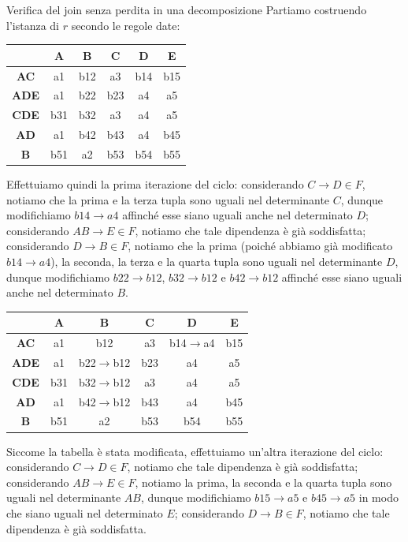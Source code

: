 \begin{Example}{Verifica del join senza perdita in una decomposizione}{}
    Partiamo costruendo l'istanza di $r$ secondo le regole date:
    \begin{center}
        \begin{tabular}{|c|c|c|c|c|c|}
            \hline &\textbf{A} & \textbf{B} & \textbf{C} & \textbf{D} & \textbf{E}\\\hline
            \textbf{AC} & a1 & b12 & a3 & b14 & b15\\
            \textbf{ADE} & a1 & b22 & b23 & a4 & a5\\
            \textbf{CDE} & b31 & b32 & a3 & a4 & a5\\
            \textbf{AD} & a1 & b42 & b43 & a4 & b45\\
            \textbf{B} & b51 & a2 & b53 & b54 & b55\\\hline
        \end{tabular}\hspace{1cm}
    \end{center}
    Effettuiamo quindi la prima iterazione del ciclo: considerando $C\to D \in F$, notiamo che la prima e la terza tupla sono uguali nel determinante $C$, dunque modifichiamo $b14\to a4$ affinché esse siano uguali anche nel determinato $D$; considerando $AB\to E \in F$, notiamo che tale dipendenza è già soddisfatta; considerando $D\to B \in F$, notiamo che la prima (poiché abbiamo già modificato $b14\to a4$), la seconda, la terza e la quarta tupla sono uguali nel determinante $D$, dunque modifichiamo $b22\to b12$, $b32\to b12$ e $b42\to b12$ affinché esse siano uguali anche nel determinato $B$.
    \begin{center}
        \begin{tabular}{|c|c|c|c|c|c|}
            \hline &\textbf{A} & \textbf{B} & \textbf{C} & \textbf{D} & \textbf{E}\\\hline
            \textbf{AC} & a1 & b12 & a3 & b14$\to$a4 & b15\\
            \textbf{ADE} & a1 & b22$\to$b12 & b23 & a4 & a5\\
            \textbf{CDE} & b31 & b32$\to$b12 & a3 & a4 & a5\\
            \textbf{AD} & a1 & b42$\to$b12 & b43 & a4 & b45\\
            \textbf{B} & b51 & a2 & b53 & b54 & b55\\\hline
        \end{tabular}\hspace{1cm}
    \end{center}
    Siccome la tabella è stata modificata, effettuiamo un'altra iterazione del ciclo: considerando $C\to D\in F$, notiamo che tale dipendenza è già soddisfatta; considerando $AB\to E\in F$, notiamo la prima, la seconda e la quarta tupla sono uguali nel determinante $AB$, dunque modifichiamo $b15\to a5$ e $b45\to a5$ in modo che siano uguali nel determinato $E$; considerando $D\to B\in F$, notiamo che tale dipendenza è già soddisfatta.

\end{Example}
